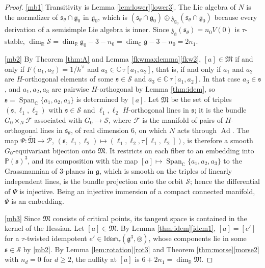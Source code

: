 \documentclass[leqno,10pt]{amsart}
\theoremstyle{definition}
\numberwithin{equation}{section}
\newcommand{\idem}{\mathbb{Idem}}
\newcommand{\tmlt}{\circledcirc}
\newcommand{\spn}{\operatorname{Span}}
\newcommand{\proj}{\mathbb{P}}
\newcommand{\g}{\mathfrak{g}}
\newcommand{\Ad}{\operatorname{Ad}}
\newcommand{\rea}{\mathbb R}
\newcommand{\com}{\mathbb C}
\newcommand{\gz}{\g_{0}}
\newcommand{\hv}{h^\vee}
\newcommand{\subs}{\mathfrak{s}}
\begin{document}
\begin{proof}
\ref{mb1} Transitivity is Lemma \ref{lem:lower}\ref{lower3}. The Lie algebra of $N$ is the normalizer of $\subs_{\theta} \cap \gz$ in $\gz$, which is $(\subs_{\theta} \cap \gz) \oplus \mathfrak{z}_{\gz}(\subs_{\theta} \cap \gz)$ because every derivation of a semisimple Lie algebra is inner. Since $\mathfrak{z}_{\g}(\subs_{\theta}) = n_{0}V(0)$ is $\tau$-stable, $\dim_{\rea}\mathcal{S} = \dim_{\rea}\gz - 3 - n_{0} = \dim_{\com}\g - 3 - n_{0} = 2n_{1}$.

\ref{mb2} By Theorem \ref{thm:A} and Lemma \ref{fkwmaxlemma}\ref{fkw2}, $[a] \in \mathfrak{M}$ if and only if $F(a_{1}, a_{2}) = 1/\hv$ and $a_{3} \in \com\,\tau[a_{1}, a_{2}]$, that is, if and only if $a_{1}$ and $a_{2}$ are $H$-orthogonal elements of some $\subs \in \mathcal{S}$ and $a_{3} \in \com\,\tau[a_{1}, a_{2}]$. In that case $a_{3} \in \subs$, and $a_{1}, a_{2}, a_{3}$ are pairwise $H$-orthogonal by Lemma \ref{thm:idem}, so $\subs = \spn_{\com}\{a_{1}, a_{2}, a_{3}\}$ is determined by $[a]$. Let $\widetilde{\mathfrak{M}}$ be the set of triples $(\subs, \ell_{1}, \ell_{2})$ with $\subs \in \mathcal{S}$ and $\ell_{1}, \ell_{2}$ $H$-orthogonal lines in $\subs$; it is the bundle $G_{0} \times_{N} \mathcal{F}$ associated with $G_{0} \to \mathcal{S}$, where $\mathcal{F}$ is the manifold of pairs of $H$-orthogonal lines in $\subs_{\theta}$, of real dimension $6$, on which $N$ acts through $\Ad$. The map $\Psi:\widetilde{\mathfrak{M}} \to \mathcal{P}$, $(\subs, \ell_{1}, \ell_{2}) \mapsto (\ell_{1}, \ell_{2}, \tau[\ell_{1}, \ell_{2}])$, is therefore a smooth $G_{0}$-equivariant bijection onto $\mathfrak{M}$. It restricts on each fiber to an embedding into $\proj(\subs)^{3}$, and its composition with the map $[a] \mapsto \spn_{\com}\{a_{1}, a_{2}, a_{3}\}$ to the Grassmannian of $3$-planes in $\g$, which is smooth on the triples of linearly independent lines, is the bundle projection onto the orbit $\mathcal{S}$; hence the differential of $\Psi$ is injective. Being an injective immersion of a compact connected manifold, $\Psi$ is an embedding.

\ref{mb3} Since $\mathfrak{M}$ consists of critical points, its tangent space is contained in the kernel of the Hessian. Let $[a] \in \mathfrak{M}$. By Lemma \ref{thm:idem}\ref{idem1}, $[a] = [e']$ for a $\tau$-twisted idempotent $e' \in \idem_{\tau}(\g^{3}, \tmlt)$, whose components lie in some $\subs \in \mathcal{S}$ by \ref{mb2}. By Lemma \ref{lem:rotation}\ref{rot3} and Theorem \ref{thm:morse}\ref{morse2} with $n_{d} = 0$ for $d \geq 2$, the nullity at $[a]$ is $6 + 2n_{1} = \dim_{\rea}\mathfrak{M}$.
\end{proof}
\end{document}
